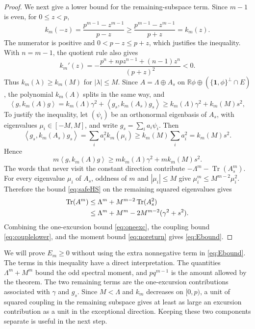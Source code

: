 \documentclass[11pt]{article}
\numberwithin{equation}{section}
\newcommand{\Tr}{\operatorname{Tr}}
\newcommand{\one}{\mathbf 1}
\newcommand{\R}{\mathbb R}
\newcommand{\ip}[2]{\left\langle #1,#2\right\rangle}
\begin{document}
\begin{proof}
We next give a lower bound for the remaining-subspace term.
Since $m-1$ is even, for $0\le z<p$,
\[
 k_m(-z)=\frac{p^{m-1}-z^{m-1}}{p-z}
  \ge\frac{p^{m-1}-z^{m-1}}{p+z}=k_m(z).
\]
The numerator is positive and $0<p-z\le p+z$, which justifies
the inequality. With $n=m-1$, the quotient rule also gives
\[
 k_m'(z)=-\frac{p^n+npz^{n-1}+(n-1)z^n}{(p+z)^2}<0.
\]
Thus $k_m(\lambda)\ge k_m(M)$ for $|\lambda|\le M$. Since $A=\Lambda\oplus A_s$ on $\R\phi\oplus(\{\one,\phi\}^\perp\cap E)$, the polynomial $k_m(A)$ splits in the same way, and
\[
 \ip{g}{k_m(A)g}=k_m(\Lambda)\gamma^2+\ip{g_s}{k_m(A_s)g_s}
 \ge k_m(\Lambda)\gamma^2+k_m(M)s^2,
\]
To justify the inequality, let $(\psi_i)$ be an orthonormal
eigenbasis of $A_s$, with eigenvalues $\mu_i\in[-M,M]$, and write
$g_s=\sum_i a_i\psi_i$. Then
\[
 \ip{g_s}{k_m(A_s)g_s}
  =\sum_i a_i^2k_m(\mu_i)
  \ge k_m(M)\sum_i a_i^2=k_m(M)s^2.
\]
Hence
\begin{equation}\label{eq:couplelower}
 m\ip{g}{k_m(A)g}\ge m k_m(\Lambda)\gamma^2+m k_m(M)s^2.
\end{equation}
The words that never visit the constant direction contribute
$-\Lambda^m-\Tr(A_s^m)$. For every eigenvalue $\mu_i$ of $A_s$,
oddness of $m$ and $|\mu_i|\le M$ give
$\mu_i^m\le M^{m-2}\mu_i^2$. Therefore the bound
\eqref{eq:safeHS} on the remaining squared eigenvalues gives
\begin{align}\label{eq:noreturn}
 \Tr(A^m)
 &\le\Lambda^m+M^{m-2}\Tr(A_s^2)\notag\\
 &\le\Lambda^m+M^m-2M^{m-2}(\gamma^2+s^2).
\end{align}
Combining the one-excursion bound \eqref{eq:oneexc}, the coupling
bound \eqref{eq:couplelower}, and the moment bound
\eqref{eq:noreturn} gives \eqref{eq:Ebound}.
\end{proof}
We will prove $E_m\ge0$ without using the extra nonnegative term in \eqref{eq:Ebound}.
The terms in this inequality have a direct interpretation. The
quantities $\Lambda^m+M^m$ bound the odd spectral moment, and
$pq^{m-1}$ is the amount allowed by the theorem. The two remaining
terms are the one-excursion contributions associated with $\gamma$
and $g_s$. Since $M<\Lambda$ and $k_m$ decreases on $[0,p)$, a unit
of squared coupling in the remaining subspace gives at least as large
an excursion contribution as a unit in the exceptional direction.
Keeping these two components separate is useful in the next step.
\end{document}
